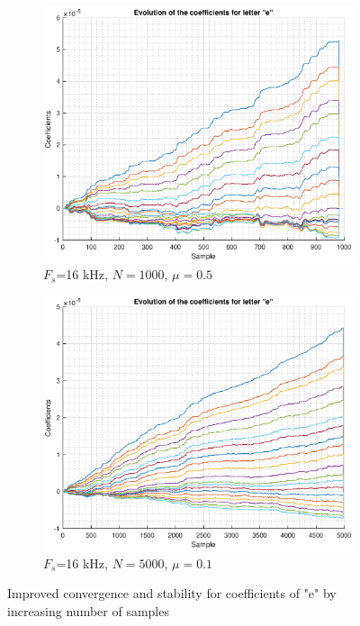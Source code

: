\documentclass{article}
\begin{document}
\begin{figure}[h!]
\centering
\begin{subfigure}{0.33\textwidth}
\centering
\includegraphics[width = \textwidth]{speech_e_16k}
\caption{$F_s$=16 kHz, $N=1000$, $\mu=0.5$}
\label{fig:speech_e_16k}
\end{subfigure}
\begin{subfigure}{0.33\textwidth}
\centering
\includegraphics[width = \textwidth]{speech_e_16k_2}
\caption{$F_s$=16 kHz, $N=5000$, $\mu=0.1$}
\label{fig:speech_e_16k_2}
\end{subfigure}
\caption{Improved convergence and stability for coefficients of "e" by increasing number of samples}
\label{speech_e_16k_comp}
\end{figure}
\end{document}
